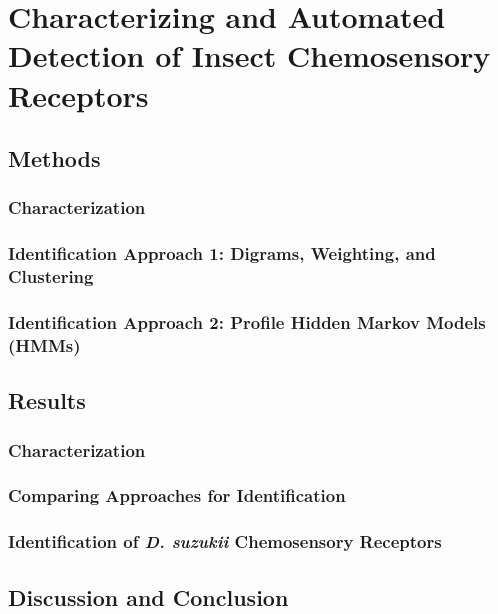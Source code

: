 \section{Characterizing and Automated Detection of Insect Chemosensory Receptors}

\subsection{Methods}

\subsubsection{Characterization}

\subsubsection{Identification Approach 1: Digrams, Weighting, and Clustering}

\subsubsection{Identification Approach 2: Profile Hidden Markov Models (HMMs)}

\subsection{Results}

\subsubsection{Characterization}

\subsubsection{Comparing Approaches for Identification}

\subsubsection{Identification of \emph{D. suzukii} Chemosensory Receptors}

\subsection{Discussion and Conclusion}